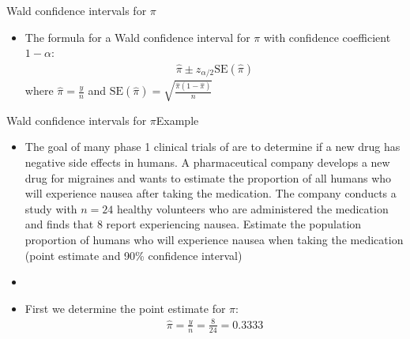 \documentclass[xcolor=dvipsnames]{beamer}
\begin{document}
\begin{frame}{Wald confidence intervals for $\pi$}
	\begin{itemize}
		\item The formula for a Wald confidence interval for $\pi$ with confidence coefficient $1-\alpha$:
		\begin{gather*}
		\hat{\pi} \pm z_{\alpha/2} \text{SE}(\hat{\pi})
		\end{gather*}
		where $\hat{\pi} = \frac{y}{n}$ and $\text{SE}(\hat{\pi}) = \sqrt{\frac{\hat{\pi}(1-\hat{\pi})}{n}}$
	\end{itemize}
\end{frame}

\begin{frame}{Wald confidence intervals for $\pi$}{Example}
	\begin{itemize}
		\item The goal of many phase 1 clinical trials of are to determine if a new drug has negative side effects in humans. A pharmaceutical company develops a new drug for migraines and wants to estimate the proportion of all humans who will experience nausea after taking the medication. The company conducts a study with $n = 24$ healthy volunteers who are administered the medication and finds that 8 report experiencing nausea. Estimate the population proportion of humans who will experience nausea when taking the medication (point estimate and 90\% confidence interval)
		\item[]
		\item First we determine the point estimate for $\pi$: 
		\begin{gather*}
			\hat{\pi} = \frac{y}{n} = \frac{8}{24} = 0.3333
		\end{gather*}
	\end{itemize}
\end{frame}
\end{document}
